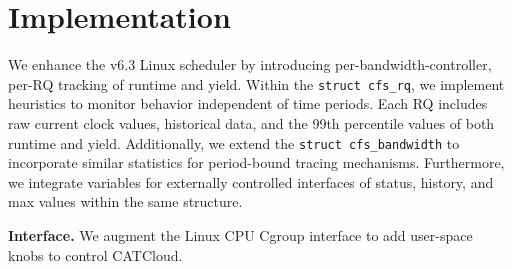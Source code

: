 \section{Implementation}
We enhance the v6.3 Linux scheduler by introducing per-bandwidth-controller, per-RQ tracking of runtime and yield. Within the \texttt{struct cfs\_rq}, we implement heuristics to monitor behavior independent of time periods. Each RQ includes raw current clock values, historical data, and the 99th percentile values of both runtime and yield.  Additionally, we extend the \texttt{struct cfs\_bandwidth} to incorporate similar statistics for period-bound tracing mechanisms. Furthermore, we integrate variables for externally controlled interfaces of status, history, and max values within the same structure.




\textbf{Interface.} We augment the Linux CPU Cgroup interface to add user-space knobs to control CATCloud.

